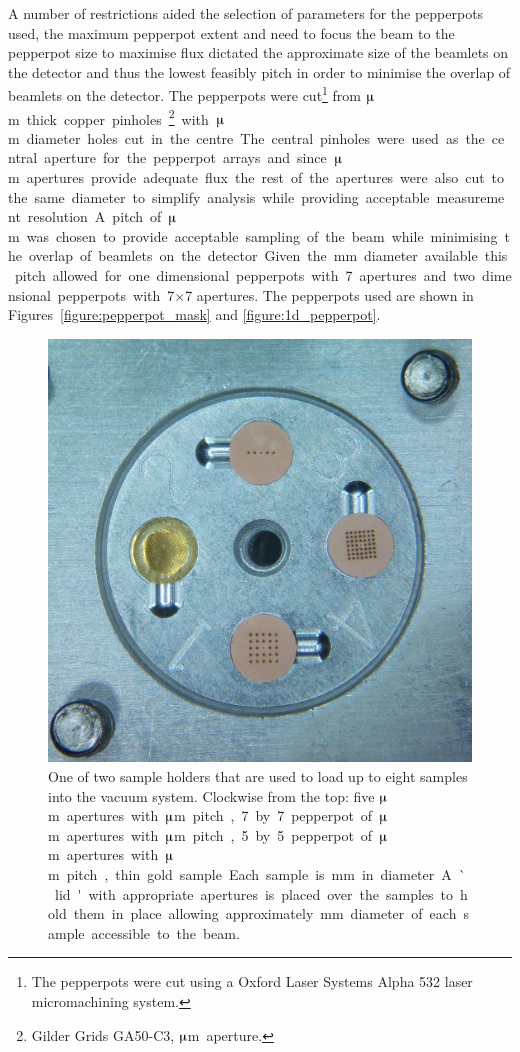 A number of restrictions aided the selection of parameters for the pepperpots used, the maximum pepperpot extent and need to focus the beam to the pepperpot size to maximise flux dictated the approximate size of the beamlets on the detector and thus the lowest feasibly pitch in order to minimise the overlap of beamlets on the detector.
The pepperpots were cut\footnote{The pepperpots were cut using a Oxford Laser Systems Alpha 532 laser micromachining system.} from \unit[25]{$\muup$m} thick copper pinholes\footnote{Gilder Grids GA50-C3, \unit[50]{$\muup$m} aperture.} with \unit[50]{$\muup$m} diameter holes cut in the centre.
The central pinholes were used as the central aperture for the pepperpot arrays and since \unit[50]{$\muup$m} apertures provide adequate flux the rest of the apertures were also cut to the same diameter to simplify analysis while providing acceptable measurement resolution.
A pitch of \unit[200]{$\muup$m} was chosen to provide acceptable sampling of the beam while minimising the overlap of beamlets on the detector.
Given the \unit[2]{mm} diameter available this pitch allowed for one dimensional pepperpots with 7 apertures and two dimensional pepperpots with 7$\times$7 apertures.
The pepperpots used are shown in Figures~\ref{figure:pepperpot_mask} and \ref{figure:1d_pepperpot}.

\begin{figure}
    \center
    \includegraphics[width=0.49\linewidth]{part2/Figs/sample_holder.jpg}
    \caption[Sample holder.]{One of two sample holders that are used to load up to eight samples into the vacuum system. Clockwise from the top: five \unit[50]{$\muup$m} apertures with \unit[300]{$\muup$m} pitch, 7 by 7 pepperpot of \unit[50]{$\muup$m} apertures with \unit[200]{$\muup$m} pitch, 5 by 5 pepperpot of \unit[50]{$\muup$m} apertures with \unit[300]{$\muup$m} pitch, thin gold sample. Each sample is \unit[3]{mm} in diameter. A `lid' with appropriate apertures is placed over the samples to hold them in place allowing approximately \unit[2]{mm} diameter of each sample accessible to the beam.}
    \label{figure:sample_holder_pepperpots}
\end{figure}

